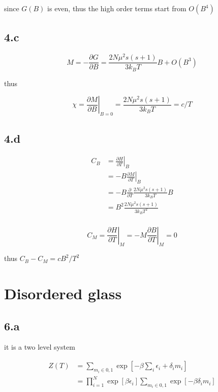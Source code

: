 \documentclass{article}
\begin{document}
since $G(B)$ is even, thus the high order terms start from $O(B^4)$

\subsection*{4.c}

$$
M = -\frac{\partial G}{\partial B} = \frac{2N\mu^2 s(s+1)}{3k_B T} B + O(B^3)
$$

thus

$$
\chi = \left.\frac{\partial M}{\partial B}\right|_{B=0} = \frac{2N\mu^2 s(s+1)}{3k_B T} = c/T
$$

\subsection*{4.d}

$$
\begin{aligned}
    C_B &= \left.\frac{\partial H}{\partial T}\right|_B\\
    &= -B \left.\frac{\partial M}{\partial T}\right|_B\\
    &= -B \frac{\partial}{\partial T} \frac{2N\mu^2 s(s+1)}{3k_B T} B\\
    &= B^2 \frac{2N\mu^2 s(s+1)}{3k_B T^2}\\
\end{aligned}
$$

$$
C_M = \left.\frac{\partial H}{\partial T}\right|_M = -M \left.\frac{\partial B}{\partial T}\right|_M = 0
$$

thus $C_B - C_M = cB^2/T^2$

\section*{Disordered glass}
\subsection*{6.a}

it is a two level system

$$
\begin{aligned}
    Z(T) &= \sum_{m_i \in {0, 1}} \exp[-\beta \sum_i \epsilon_i + \delta_i m_i]\\
    &= \prod_{i=1}^N \exp[\beta \epsilon_i] \sum_{m_i \in 0, 1} \exp[-\beta\delta_i m_i]
\end{aligned}
$$
\end{document}
